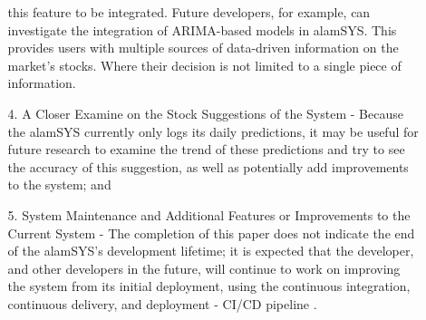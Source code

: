 \begin{itemize}
\begin{itemize}
            this feature to be integrated. Future developers, for example, can 
            investigate the integration of ARIMA-based models in alamSYS. This 
            provides users with multiple sources of data-driven information on 
            the market's stocks. Where their decision is not limited to a single 
            piece of information.
            \item[4.] A Closer Examine on the Stock Suggestions of the System - 
            Because the alamSYS currently only logs its daily predictions, it may 
            be useful for future research to examine the trend of these predictions 
            and try to see the accuracy of this suggestion, as well as potentially 
            add improvements to the system; and
            \item[5.] System Maintenance and Additional Features or Improvements
            to the Current System - 
            The completion of this paper does not indicate the end of the alamSYS's 
            development lifetime; it is expected that the developer, and other 
            developers in the future, will continue to work on improving the system 
            from its initial deployment, using the continuous integration, continuous 
            delivery, and deployment - CI/CD pipeline \cite{RedHat2022}.
        \end{itemize}


\end{itemize}

